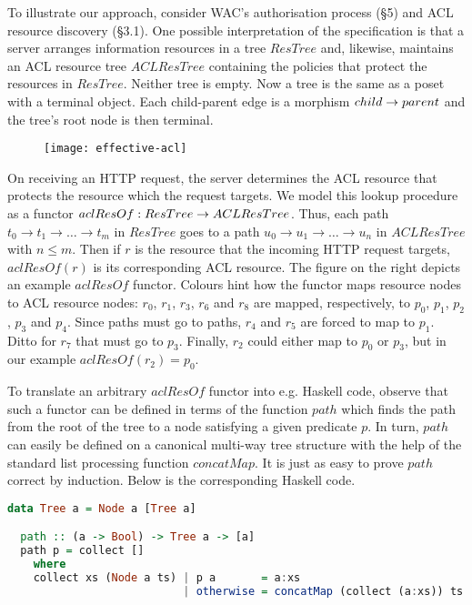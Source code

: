 To illustrate our approach, consider WAC's authorisation process (\S 5)
and ACL resource discovery (\S 3.1). One possible interpretation of
the specification is that a server arranges information resources
in a tree $ResTree$ and, likewise, maintains an ACL resource tree
$ACLResTree$ containing the policies that protect the resources in
$ResTree$. Neither tree is empty. Now a tree is the same as a poset
with a terminal object. Each child-parent edge is a morphism
$child \rightarrow parent$ and the tree's root node is then terminal.

\begin{wrapfigure}{r}{0.5\textwidth}
  \texttt{[image: effective-acl]}
\end{wrapfigure}

On receiving an HTTP request, the server determines the ACL resource
that protects the resource which the request targets. We model this
lookup procedure as a functor $aclResOf : ResTree \rightarrow ACLResTree$.
Thus, each path $t_0 \rightarrow t_1 \rightarrow \ldots \rightarrow t_m$ in $ResTree$
goes to a path $u_0 \rightarrow u_1 \rightarrow \ldots \rightarrow u_n$
in $ACLResTree$ with $n \leq m$. Then if $r$ is the resource that
the incoming HTTP request targets, $aclResOf(r)$ is its corresponding
ACL resource. The figure on the right depicts an example $aclResOf$
functor. Colours hint how the functor maps resource nodes to ACL
resource nodes: $r_0$, $r_1$, $r_3$, $r_6$ and $r_8$ are mapped,
respectively, to $p_0$, $p_1$, $p_2$, $p_3$ and $p_4$. Since paths
must go to paths, $r_4$ and $r_5$ are forced to map to $p_1$. Ditto
for $r_7$ that must go to $p_3$. Finally, $r_2$ could either map to
$p_0$ or $p_3$, but in our example $aclResOf(r_2) = p_0$.

To translate an arbitrary $aclResOf$ functor into e.g. Haskell code,
observe that such a functor can be defined in terms of the function
$path$ which finds the path from the root of the tree to a node satisfying
a given predicate $p$. In turn, $path$ can easily be defined on a
canonical multi-way tree structure with the help of the standard
list processing function $concatMap$. It is just as easy to prove
$path$ correct by induction. Below is the corresponding Haskell code.
\begin{lstlisting}[language=Haskell]
  data Tree a = Node a [Tree a]

  path :: (a -> Bool) -> Tree a -> [a]
  path p = collect []
    where
    collect xs (Node a ts) | p a       = a:xs
                           | otherwise = concatMap (collect (a:xs)) ts
\end{lstlisting}

